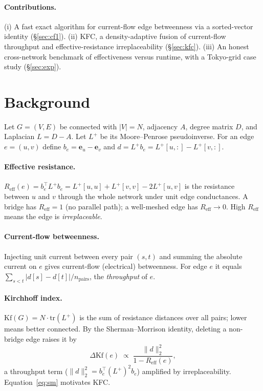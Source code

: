 \documentclass[11pt]{article}
\begin{document}
\paragraph{Contributions.}
(i) A fast exact algorithm for current-flow edge betweenness via a sorted-vector
identity (\S\ref{sec:cf1}). (ii) KFC, a density-adaptive fusion of current-flow
throughput and effective-resistance irreplaceability (\S\ref{sec:kfc}). (iii) An honest
cross-network benchmark of effectiveness versus runtime, with a Tokyo-grid case study
(\S\ref{sec:exp}).

\section{Background}
Let $G=(V,E)$ be connected with $|V|=N$, adjacency $A$, degree matrix $D$, and Laplacian
$L=D-A$. Let $L^{+}$ be its Moore--Penrose pseudoinverse. For an edge $e=(u,v)$ define
$b_e = \mathbf{e}_u - \mathbf{e}_v$ and $d = L^{+}b_e = L^{+}[u,:]-L^{+}[v,:]$.

\paragraph{Effective resistance.}
$R_{\mathrm{eff}}(e) = b_e^{\top}L^{+}b_e = L^{+}[u,u]+L^{+}[v,v]-2L^{+}[u,v]$ is the
resistance between $u$ and $v$ through the whole network under unit edge conductances. A
bridge has $R_{\mathrm{eff}}=1$ (no parallel path); a well-meshed edge has
$R_{\mathrm{eff}}\to 0$. High $R_{\mathrm{eff}}$ means the edge is \emph{irreplaceable}.

\paragraph{Current-flow betweenness.}
Injecting unit current between every pair $(s,t)$ and summing the absolute current on
$e$ gives current-flow (electrical) betweenness. For edge $e$ it equals
$\sum_{s<t}|d[s]-d[t]|/n_{\text{pairs}}$, the \emph{throughput} of $e$.

\paragraph{Kirchhoff index.}
$\mathrm{Kf}(G)=N\cdot\mathrm{tr}(L^{+})$ is the sum of resistance distances over all
pairs; lower means better connected. By the Sherman--Morrison identity, deleting a
non-bridge edge raises it by
\begin{equation}\label{eq:sm}
\Delta\mathrm{Kf}(e) \;\propto\; \frac{\lVert d\rVert_2^{2}}{1-R_{\mathrm{eff}}(e)} ,
\end{equation}
a throughput term ($\lVert d\rVert_2^2 = b_e^\top (L^+)^2 b_e$) amplified by
irreplaceability. Equation~\eqref{eq:sm} motivates KFC.
\end{document}
